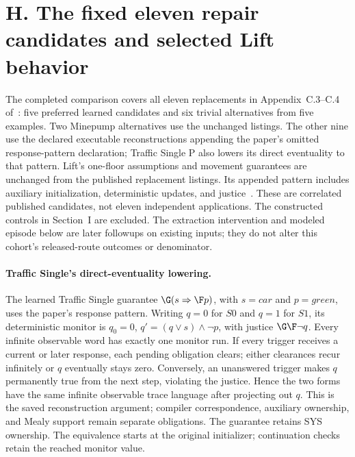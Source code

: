 \section*{H. The fixed eleven repair candidates and selected Lift behavior}
\label{supp:repair-eleven}
The completed comparison covers all eleven replacements in
Appendix~C.3--C.4 of~\cite{degradation}: five preferred learned candidates
and six trivial alternatives from five examples. Two Minepump alternatives
use the unchanged listings. The other nine use the declared executable
reconstructions appending the paper's omitted response-pattern declaration;
Traffic Single P also lowers its direct eventuality to that pattern.
Lift's one-floor assumptions and movement guarantees are unchanged from
the published replacement listings. Its appended pattern includes auxiliary
initialization, deterministic updates, and justice~\cite[Appendix C.2.1, C.3.3, and C.4.3]{degradation}.
These are correlated published candidates, not eleven independent
applications. The constructed controls in Section~I are excluded.
The extraction intervention and modeled episode below are later
followups on existing inputs; they do not alter this cohort's
released-route outcomes or denominator.

\paragraph{Traffic Single's direct-eventuality lowering.}
The learned Traffic Single guarantee $\G(s\Rightarrow\F p)$, with
$s=\mathit{car}$ and $p=\mathit{green}$, uses the paper's response pattern.
Writing $q=0$ for $S0$ and $q=1$ for $S1$, its deterministic monitor is
$q_0=0$, $q'=(q\lor s)\land\neg p$, with justice $\G\F\neg q$.
Every infinite observable word has exactly one monitor run.
If every trigger receives a current or later response, each pending
obligation clears; either clearances recur infinitely or $q$ eventually
stays zero. Conversely, an unanswered trigger makes $q$ permanently
true from the next step, violating the justice.
Hence the two forms have the same infinite observable trace language
after projecting out $q$. This is the saved reconstruction argument;
compiler correspondence, auxiliary ownership, and Mealy support remain
separate obligations. The guarantee retains SYS ownership.
The equivalence starts at the original initializer; continuation checks
retain the reached monitor value.

